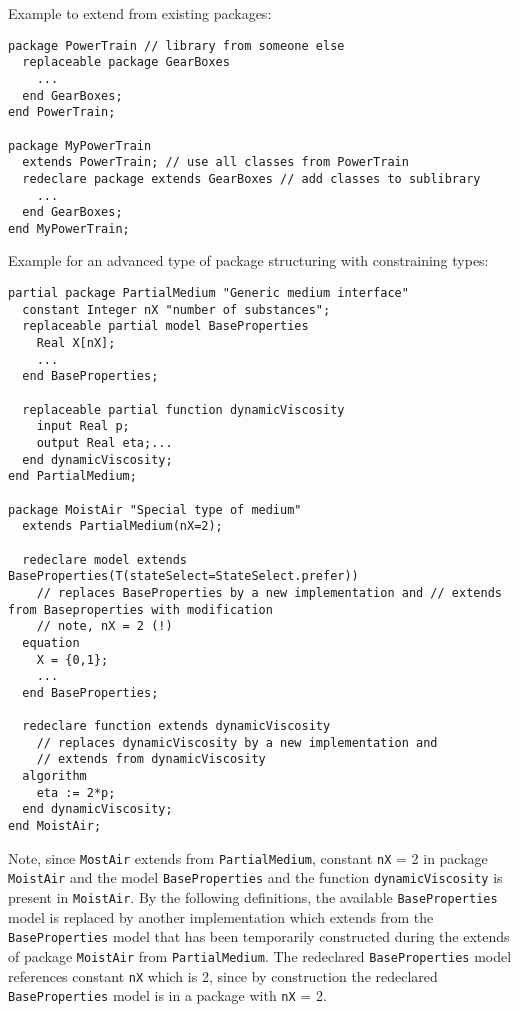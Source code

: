 \begin{nonnormative}
Example to extend from existing packages:
\begin{lstlisting}[language=modelica]
package PowerTrain // library from someone else
  replaceable package GearBoxes
    ...
  end GearBoxes;
end PowerTrain;

package MyPowerTrain
  extends PowerTrain; // use all classes from PowerTrain
  redeclare package extends GearBoxes // add classes to sublibrary
    ...
  end GearBoxes;
end MyPowerTrain;
\end{lstlisting}

Example for an advanced type of package structuring with constraining types:
\begin{lstlisting}[language=modelica]
partial package PartialMedium "Generic medium interface"
  constant Integer nX "number of substances";
  replaceable partial model BaseProperties
    Real X[nX];
    ...
  end BaseProperties;

  replaceable partial function dynamicViscosity
    input Real p;
    output Real eta;...
  end dynamicViscosity;
end PartialMedium;

package MoistAir "Special type of medium"
  extends PartialMedium(nX=2);

  redeclare model extends BaseProperties(T(stateSelect=StateSelect.prefer))
    // replaces BaseProperties by a new implementation and // extends from Baseproperties with modification
    // note, nX = 2 (!)
  equation
    X = {0,1};
    ...
  end BaseProperties;

  redeclare function extends dynamicViscosity
    // replaces dynamicViscosity by a new implementation and
    // extends from dynamicViscosity
  algorithm
    eta := 2*p;
  end dynamicViscosity;
end MoistAir;
\end{lstlisting}

Note, since \lstinline!MostAir! extends from \lstinline!PartialMedium!,
constant \lstinline!nX! = 2 in package \lstinline!MoistAir! and the model
\lstinline!BaseProperties! and the function \lstinline!dynamicViscosity! is present
in \lstinline!MoistAir!. By the following definitions, the available
\lstinline!BaseProperties! model is replaced by another implementation which
extends from the \lstinline!BaseProperties! model that has been temporarily
constructed during the extends of package \lstinline!MoistAir! from
\lstinline!PartialMedium!. The redeclared \lstinline!BaseProperties! model
references constant \lstinline!nX! which is 2, since by construction the
redeclared \lstinline!BaseProperties! model is in a package with \lstinline!nX! = 2.


\end{nonnormative}
